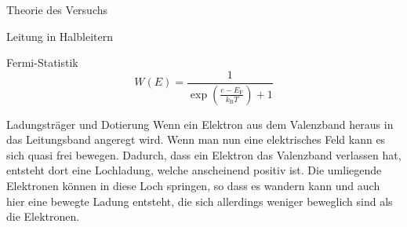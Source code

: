 \documentclass[pdftex, a4paper,11pt, twoside, ngerman]{report}
\begin{document}
\begin{chapter}{Theorie des Versuchs}
\begin{section}{Leitung in Halbleitern}
\begin{subsection}{Fermi-Statistik}
            \begin{equation}
                W(E) = \frac{1}{\exp({\frac{e-E_\text{F}}{k_\text{B}T}})+1}
            \end{equation}
            
        \end{subsection}

        \begin{subsection}{Ladungsträger und Dotierung}
            Wenn ein Elektron aus dem Valenzband heraus in das Leitungsband angeregt wird.
            Wenn man nun eine elektrisches Feld kann es sich quasi frei bewegen.
            Dadurch, dass ein Elektron das Valenzband verlassen hat, entsteht dort eine Lochladung, welche anscheinend positiv ist. 
            Die umliegende Elektronen können in diese Loch springen, so dass es wandern kann und auch hier eine bewegte Ladung entsteht, die sich allerdings weniger beweglich sind als die Elektronen.
            

\end{subsection}
\end{section}
\end{chapter}
\end{document}
